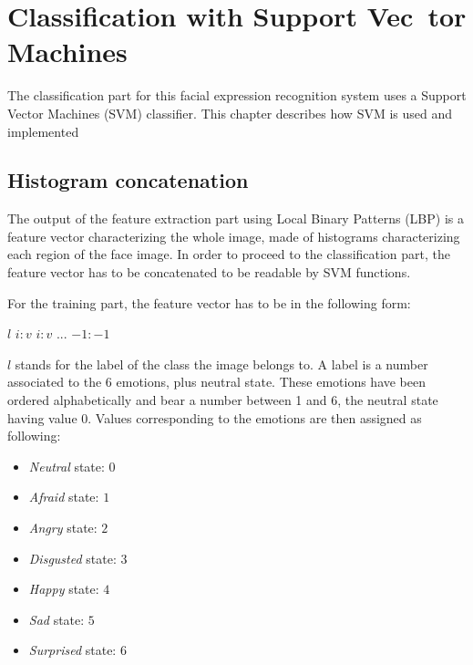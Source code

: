 \chapter{Classification with Support Vec~tor Machines}
\label{chap:implementation_svm}

\noindent The classification part for this facial expression recognition system uses a Support Vector Machines (SVM) classifier. This chapter describes how SVM is used and implemented
\newline

\section{Histogram concatenation}

\vspace{\baselineskip}
\noindent The output of the feature extraction part using Local Binary Patterns (LBP) is a feature vector characterizing the whole image, made of histograms characterizing each region of the face image. In order to proceed to the classification part, the feature vector has to be concatenated to be readable by SVM functions.
\newline

\noindent For the training part, the feature vector has to be in the following form:
\begin{center}
\noindent $ l $ \hspace{0.7cm} $ i:v $ \hspace{0.2cm} $ i:v $ \hspace{0.2cm} $ ... $ \hspace{0.2cm} $ -1:-1 $
\end{center} 
\noindent $ l $ stands for the label of the class the image belongs to. A label is a number associated to the 6 emotions, plus neutral state. These emotions have been ordered alphabetically and bear a number between 1 and 6, the neutral state having value 0. Values corresponding to the emotions are then assigned as following:

\begin{itemize}
	\item \textit{Neutral} state: $ 0 $
	\item \textit{Afraid} state: $ 1 $
	\item \textit{Angry} state: $ 2 $
	\item \textit{Disgusted} state: $ 3 $
	\item \textit{Happy} state: $ 4 $
	\item \textit{Sad} state: $ 5 $
	\item \textit{Surprised} state: $ 6 $
\end{itemize}

